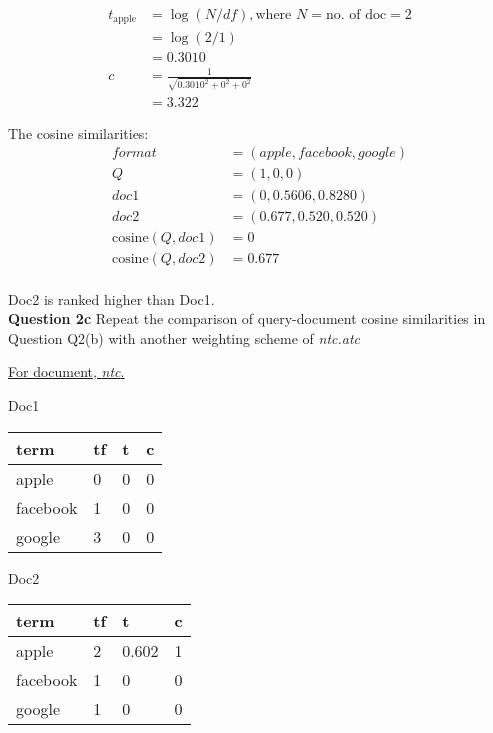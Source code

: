 \documentclass[11pt,a4paper]{report}
\begin{document}
\begin{multicols*}{2}
\begin{equation*} 
\begin{split}
t_{\text{apple}} & = \log(N/df), \text{where }N = \text{no. of doc} = 2 \\
& = \log(2/1) \\
& = 0.3010 \\
c &= \frac{1}{\sqrt{0.3010^2 + 0^2 + 0^2}} \\
  &= 3.322
\end{split}
\end{equation*}

\noindent The cosine similarities:
\begin{equation*}
\begin{split}
format &= (apple, facebook, google)\\
Q &= (1, 0, 0)\\
doc1 &= (0, 0.5606 ,0.8280)\\
doc2 &= (0.677, 0.520, 0.520)\\
\text{cosine}(Q, doc1) &= 0\\
\text{cosine}(Q, doc2) &= 0.677\\
\end{split}
\end{equation*}

\noindent Doc2 is ranked higher than Doc1.\\

\noindent \textbf{Question 2c} Repeat the comparison of query-document cosine similarities in Question Q2(b) with another weighting scheme of \textit{ntc.atc}

\noindent \underline{For document, \textit{ntc}.}

\noindent Doc1

\begin{center}
\begin{tabular}{|l | l | l | l|}
    \hline
    term     & tf & t & c \\
    \hline
    apple    & 0 & 0 & 0 \\
    facebook & 1 & 0 & 0 \\
    google   & 3 & 0 & 0 \\
    \hline
\end{tabular}
\end{center}

\noindent Doc2

\begin{center}
\begin{tabular}{|l | l | l | l|}
    \hline
    term     & tf & t & c \\
    \hline
    apple    & 2 & 0.602 & 1 \\
    facebook & 1 & 0 & 0\\
    google   & 1 & 0 & 0\\
    \hline
\end{tabular}
\end{center}


\end{multicols*}
\end{document}
